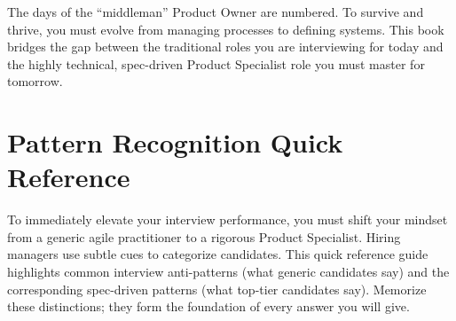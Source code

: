 The days of the ``middleman'' Product Owner are numbered. To survive and
thrive, you must evolve from managing processes to defining systems.
This book bridges the gap between the traditional roles you are
interviewing for today and the highly technical, spec-driven Product
Specialist role you must master for tomorrow.

\section{Pattern Recognition Quick
Reference}\label{pattern-recognition-quick-reference}

To immediately elevate your interview performance, you must shift your
mindset from a generic agile practitioner to a rigorous Product
Specialist. Hiring managers use subtle cues to categorize candidates.
This quick reference guide highlights common interview anti-patterns
(what generic candidates say) and the corresponding spec-driven patterns
(what top-tier candidates say). Memorize these distinctions; they form
the foundation of every answer you will give.

